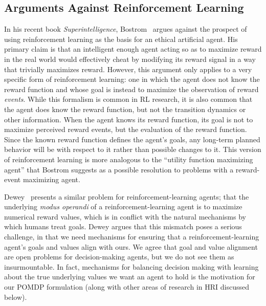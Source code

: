 \documentclass[11pt]{article}
\begin{document}
\subsection{Arguments Against Reinforcement Learning}
In his recent book {\it Superintelligence}, Bostrom~ argues against the prospect of using reinforcement learning as the basis for an ethical artificial agent. His primary claim is that an intelligent enough agent acting so as to maximize reward in the real world would effectively cheat by modifying its reward signal in a way that trivially maximizes reward. However, this argument only applies to a very specific form of reinforcement learning: one in which the agent does not know the reward function and whose goal is instead to maximize the observation of reward {\em events}. While this formalism is common in RL research, it is also common that the agent does know the reward function, but not the transition dynamics or other information. When the agent knows its reward function, its goal is not to maximize perceived reward events, but the evaluation of the reward function. Since the known reward function defines the agent's goals, any long-term planned behavior will be with respect to it rather than possible changes to it. This version of reinforcement learning is more analogous to the ``utility function maximizing agent'' that Bostrom suggests as a possible resolution to problems with a reward-event maximizing agent.

Dewey~ presents a similar problem for reinforcement-learning agents; that the underlying {\it modus operandi} of a reinforcement-learning agent is to maximize numerical reward values, which is in conflict with the natural mechanisms by which humans treat goals. Dewey argues that this mismatch poses a serious challenge, in that we need mechanisms for ensuring that a reinforcement-learning agent's goals and values align with ours. We agree that goal and value alignment are open problems for decision-making agents, but we do not see them as insurmountable.
In fact, mechanisms for balancing decision making with learning about the true underlying values we want an agent to hold is the motivation for our POMDP formulation (along with other areas of research in HRI discussed below).

\end{document}
